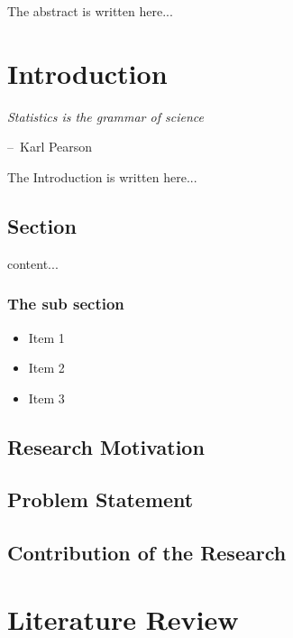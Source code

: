 \documentclass[12pt,a4paper]{report}
\makeatletter
\newenvironment{chapquote}[2][2em]
{\setlength{\@tempdima}{#1}%
\def\chapquote@author{#2}%
\parshape 1 \@tempdima \dimexpr\textwidth-2\@tempdima\relax%
\itshape}
{\par\normalfont\hfill--\ \chapquote@author\hspace*{\@tempdima}\par\bigskip}
\makeatother
\begin{document}
The abstract is written here...

\onehalfspacing
\newcommand\secTOC[1]{
\section*{Appendix}
\addcontentsline{toc}{section}{Appendix}
\markboth{Appendix}{Appendix}}
\tableofcontents
\listoftables
\listoffigures
\newpage
{}

\chapter{Introduction}
\begin{chapquote}{Karl Pearson}
	Statistics is the grammar of science
\end{chapquote}

The Introduction is written here...

\section{Section}
content...

\subsection{The sub section}

\begin{itemize}
	\item Item 1
	\item Item 2
	\item Item 3
\end{itemize}

\section{Research Motivation}

\section{Problem Statement}

\section{Contribution of the Research}

\chapter{Literature Review} 
\end{document}
